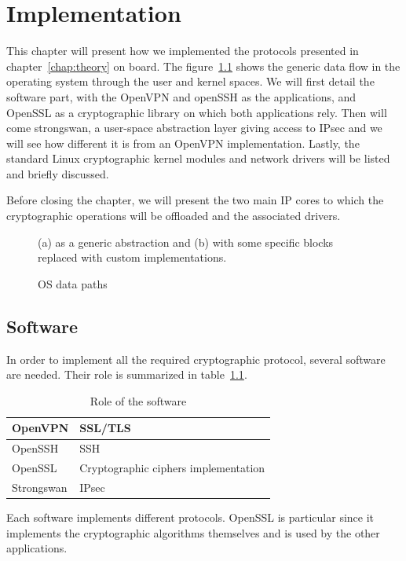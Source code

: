 \chapter{Implementation}
This chapter will present how we implemented the protocols presented in chapter~\ref{chap:theory} on board.
The figure~\ref{fig:os-path-generic} shows the generic data flow in the operating system through the user and kernel spaces.
We will first detail the software part, with the OpenVPN and openSSH as the applications, and OpenSSL as a cryptographic library on which both applications rely.
Then will come strongswan, a user-space abstraction layer giving access to IPsec and we will see how different it is from an OpenVPN implementation.
Lastly, the standard Linux cryptographic kernel modules and network drivers will be listed and briefly discussed.

Before closing the chapter, we will present the two main IP cores to which the cryptographic operations will be offloaded and the associated drivers.


\begin{figure}[ht]
\center
{}
\caption{OS data paths}{(a) as a generic abstraction and (b) with some specific blocks replaced with custom implementations.}
\label{fig:os-path-generic}
\end{figure}

\section{Software}
In order to implement all the required cryptographic protocol, several software are needed.
Their role is summarized in table~\ref{tab:soft-role}.

\begin{table}[ht]
\center
\begin{tabular}{|l|l|} \hline
OpenVPN & SSL/TLS \\ \hline
OpenSSH & SSH \\ \hline
OpenSSL & Cryptographic ciphers implementation \\ \hline
Strongswan & IPsec \\ \hline
\end{tabular}
\caption{Role of the software}{Each software implements different protocols. OpenSSL is particular since it implements the cryptographic algorithms themselves and is used by the other applications.}
\label{tab:soft-role}
\end{table}

